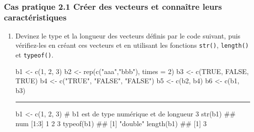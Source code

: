 \documentclass[12pt,twosided, notitlepage]{book}
\newenvironment{Shaded}{}{}
\newcommand{\KeywordTok}[1]{\textcolor[rgb]{0.00,0.00,1.00}{{#1}}}
\newcommand{\DataTypeTok}[1]{{#1}}
\newcommand{\DecValTok}[1]{{#1}}
\newcommand{\StringTok}[1]{\textcolor[rgb]{0.00,0.50,0.50}{{#1}}}
\newcommand{\CommentTok}[1]{\textcolor[rgb]{0.00,0.50,0.00}{{#1}}}
\newcommand{\OtherTok}[1]{\textcolor[rgb]{1.00,0.25,0.00}{{#1}}}
\newcommand{\NormalTok}[1]{{#1}}
\newif \ifsol
\renewenvironment{Shaded}{\begin{snugshade}}{\end{snugshade}}
\begin{document}
~

\subsubsection{\texorpdfstring{\textbf{Cas pratique 2.1} Créer des
vecteurs et connaître leurs
caractéristiques}{Cas pratique 2.1 Créer des vecteurs et connaître leurs caractéristiques}}\label{cas-pratique-2.1-creer-des-vecteurs-et-connaitre-leurs-caracteristiques}


\begin{enumerate}
\def\labelenumi{\alph{enumi}.}
\item
  Devinez le type et la longueur des vecteurs définis par le code
  suivant, puis vérifiez-les en créant ces vecteurs et en utilisant les
  fonctions \texttt{str()},
  \texttt{length()} et
  \texttt{typeof()}.

\begin{Shaded}
\begin{Highlighting}[]
\NormalTok{b1 <-}\StringTok{ }\KeywordTok{c}\NormalTok{(}\DecValTok{1}\NormalTok{, }\DecValTok{2}\NormalTok{, }\DecValTok{3}\NormalTok{)}
\NormalTok{b2 <-}\StringTok{ }\KeywordTok{rep}\NormalTok{(}\KeywordTok{c}\NormalTok{(}\StringTok{"aaa"}\NormalTok{,}\StringTok{"bbb"}\NormalTok{), }\DataTypeTok{times =} \DecValTok{2}\NormalTok{)}
\NormalTok{b3 <-}\StringTok{ }\KeywordTok{c}\NormalTok{(}\OtherTok{TRUE}\NormalTok{, }\OtherTok{FALSE}\NormalTok{, }\OtherTok{TRUE}\NormalTok{)}
\NormalTok{b4 <-}\StringTok{ }\KeywordTok{c}\NormalTok{(}\StringTok{"TRUE"}\NormalTok{, }\StringTok{"FALSE"}\NormalTok{, }\StringTok{"FALSE"}\NormalTok{)}
\NormalTok{b5 <-}\StringTok{ }\KeywordTok{c}\NormalTok{(b2, b4)}
\NormalTok{b6 <-}\StringTok{ }\KeywordTok{c}\NormalTok{(b1, b3)}
\end{Highlighting}
\end{Shaded}

  \ifsol 

  \begin{center} \rule{0.5\linewidth}{\linethickness}\end{center}

\begin{Shaded}
\begin{Highlighting}[]
\NormalTok{b1 <-}\StringTok{ }\KeywordTok{c}\NormalTok{(}\DecValTok{1}\NormalTok{, }\DecValTok{2}\NormalTok{, }\DecValTok{3}\NormalTok{)}
\CommentTok{# b1 est de type numérique et de longueur 3}
\KeywordTok{str}\NormalTok{(b1)}
  \NormalTok{##  num [1:3] 1 2 3}
\KeywordTok{typeof}\NormalTok{(b1)}
  \NormalTok{## [1] "double"}
\KeywordTok{length}\NormalTok{(b1)}
  \NormalTok{## [1] 3}


\end{Highlighting}
\end{Shaded}
\end{enumerate}
\end{document}
